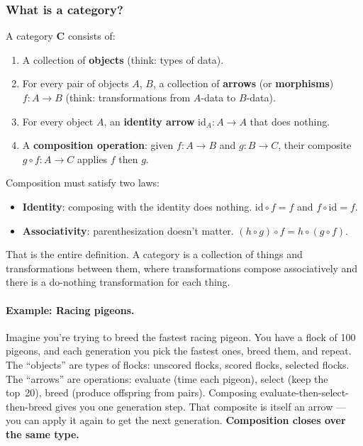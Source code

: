 \documentclass[10pt]{article}
\newcommand{\catC}{\mathbf{C}}
\newcommand{\ident}{\mathrm{id}}
\begin{document}
\subsubsection*{What is a category?}

A category $\catC$ consists of:

\begin{enumerate}
  \item A collection of \textbf{objects} (think: types of data).
  \item For every pair of objects $A$, $B$, a collection of \textbf{arrows} (or \textbf{morphisms}) $f : A \to B$ (think: transformations from $A$-data to $B$-data).
  \item For every object $A$, an \textbf{identity arrow} $\ident_A : A \to A$ that does nothing.
  \item A \textbf{composition operation}: given $f : A \to B$ and $g : B \to C$, their composite $g \circ f : A \to C$ applies $f$ then $g$.
\end{enumerate}

Composition must satisfy two laws:

\begin{itemize}
  \item \textbf{Identity}: composing with the identity does nothing. $\ident \circ f = f$ and $f \circ \ident = f$.
  \item \textbf{Associativity}: parenthesization doesn't matter. $(h \circ g) \circ f = h \circ (g \circ f)$.
\end{itemize}

That is the entire definition. A category is a collection of things and transformations between them, where transformations compose associatively and there is a do-nothing transformation for each thing.

\paragraph{Example: Racing pigeons.} Imagine you're trying to breed the fastest racing pigeon. You have a flock of 100 pigeons, and each generation you pick the fastest ones, breed them, and repeat. The ``objects'' are types of flocks: unscored flocks, scored flocks, selected flocks. The ``arrows'' are operations: evaluate (time each pigeon), select (keep the top~20), breed (produce offspring from pairs). Composing evaluate-then-select-then-breed gives you one generation step. That composite is itself an arrow --- you can apply it again to get the next generation. \textbf{Composition closes over the same type.}
\end{document}
